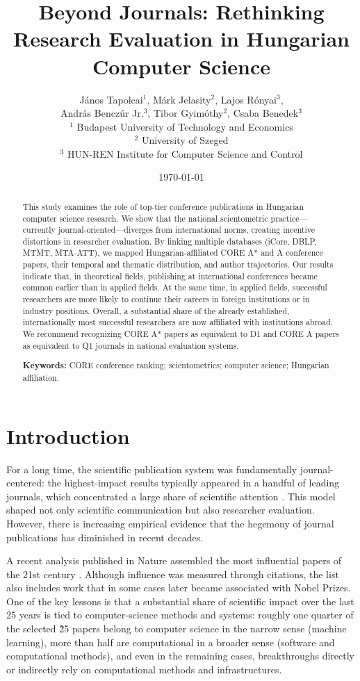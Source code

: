 \documentclass[12pt,a4paper]{article}
\title{Beyond Journals: Rethinking Research Evaluation in Hungarian Computer Science}
\author{
János Tapolcai$^{1}$,
Márk Jelasity$^{2}$,
Lajos Rónyai$^{3}$, \\
András Benczúr Jr.$^{3}$,
Tibor Gyimóthy$^{2}$,
Csaba Benedek$^{3}$\\[1ex]
\small
$^{1}$ Budapest University of Technology and Economics\\
\small
$^{2}$ University of Szeged\\
\small
$^{3}$ HUN-REN Institute for Computer Science and Control
}
\date{\today}
\begin{document}
\maketitle


\begin{abstract}
This study examines the role of top-tier conference publications in Hungarian computer science research. We show that the national scientometric practice—currently journal-oriented—diverges from international norms, creating incentive distortions in researcher evaluation. By linking multiple databases (iCore, DBLP, MTMT, MTA-ATT), we mapped Hungarian-affiliated CORE A\!* and A conference papers, their temporal and thematic distribution, and author trajectories. Our results indicate that, in theoretical fields, publishing at international conferences became common earlier than in applied fields. At the same time, in applied fields, successful researchers are more likely to continue their careers in foreign institutions or in industry positions. Overall, a substantial share of the already established, internationally most successful researchers are now affiliated with institutions abroad. We recommend recognizing CORE A\!* papers as equivalent to D1 and CORE A papers as equivalent to Q1 journals in national evaluation systems.
\par\medskip
\textbf{Keywords:} CORE conference ranking; scientometrics; computer science; Hungarian affiliation.
\end{abstract}


\section{Introduction}

For a long time, the scientific publication system was fundamentally journal-centered: the highest-impact results typically appeared in a handful of leading journals, which concentrated a large share of scientific attention \cite{ioannidis2006concentration}. This model shaped not only scientific communication but also researcher evaluation. However, there is increasing empirical evidence that the hegemony of journal publications has diminished in recent decades.

A recent analysis published in Nature assembled the most influential papers of the 21st century \cite{hutson2025most}. Although influence was measured through citations, the list also includes work that in some cases later became associated with Nobel Prizes. One of the key lessons is that a substantial share of scientific impact over the last 25 years is tied to computer-science methods and systems: roughly one quarter of the selected \~25 papers belong to computer science in the narrow sense (machine learning), more than half are computational in a broader sense (software and computational methods), and even in the remaining cases, breakthroughs directly or indirectly rely on computational methods and infrastructures.
\end{document}
